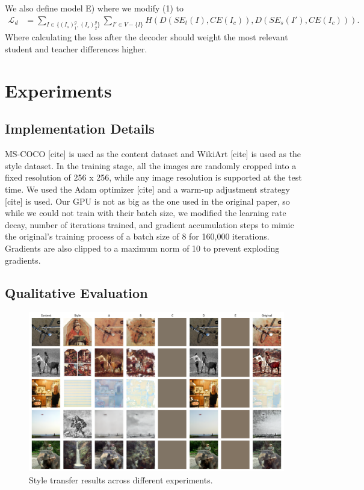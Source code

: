\documentclass{article}
\begin{document}
We also define model E) where we modify (1) to
\begin{align}
	\mathcal L_d &= \sum_{I \in \{(I_s)^g_1, (I_s)^g_2\}} \sum_{I' \in V - \{ I \}} H(D(SE_t(I), CE(I_c)), D(SE_s(I'), CE(I_c))).
\end{align}
Where calculating the loss after the decoder should weight the most relevant student and teacher differences higher.

\section{Experiments}

\subsection{Implementation Details}

MS-COCO [cite] is used as the content dataset and WikiArt [cite] is used as the style dataset. In the training stage,
all the images are randomly cropped into a fixed resolution of 256 x 256, while any image resolution is supported at the test time. We used the Adam optimizer [cite] and a warm-up adjustment strategy [cite] is used. Our GPU is not as big as the one used in the original paper, so while we could not train with their batch size, we modified the learning rate decay, number of iterations trained, and gradient accumulation steps to mimic the original's training process of a batch size of 8 for 160,000 iterations. Gradients are also clipped to a maximum norm of 10 to prevent exploding gradients.

\subsection{Qualitative Evaluation}


\begin{figure}
	\includegraphics[scale=0.35]{comparison}
	\caption{Style transfer results across different experiments.}
	\label{stylefig}
\end{figure}
\end{document}

